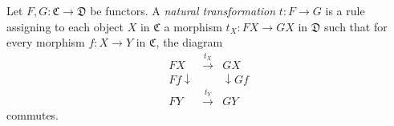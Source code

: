 Let $F, G : \mathfrak{C} \to \mathfrak{D}$ be functors. A \textit{natural transformation} $t : F \to G$ is a rule assigning to each object $X$ in $\mathfrak{C}$ a morphism $t_X : FX \to GX$ in $\mathfrak{D}$ such that for every morphism $f : X \to Y$ in $\mathfrak{C}$, the diagram
$$
\begin{array}{ccc}
FX & \xrightarrow{t_X} & GX \\
{\scriptstyle Ff}\downarrow & & \downarrow{\scriptstyle Gf} \\
FY & \xrightarrow{t_Y} & GY
\end{array}
$$
commutes.
